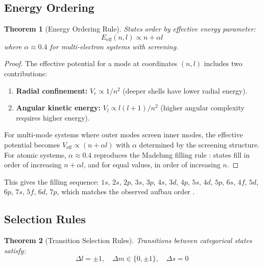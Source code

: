 \documentclass[11pt,a4paper]{article}
\newtheorem{theorem}{Theorem}[section]
\theoremstyle{definition}
\theoremstyle{remark}
\begin{document}
\subsection{Energy Ordering}

\begin{theorem}[Energy Ordering Rule]
\label{thm:energy_ordering}
States order by effective energy parameter:
\begin{equation}
E_{\mathrm{eff}}(n, l) \propto n + \alpha l
\label{eq:energy_ordering}
\end{equation}
where $\alpha \approx 0.4$ for multi-electron systems with screening.
\end{theorem}

\begin{proof}
The effective potential for a mode at coordinates $(n, l)$ includes two contributions:
\begin{enumerate}
\item \textbf{Radial confinement:} $V_r \propto 1/n^2$ (deeper shells have lower radial energy).
\item \textbf{Angular kinetic energy:} $V_l \propto l(l+1)/n^2$ (higher angular complexity requires higher energy).
\end{enumerate}

For multi-mode systems where outer modes screen inner modes, the effective potential becomes $V_{\mathrm{eff}} \propto (n + \alpha l)$ with $\alpha$ determined by the screening structure. For atomic systems, $\alpha \approx 0.4$ reproduces the Madelung filling rule \citep{madelung1936}: states fill in order of increasing $n + \alpha l$, and for equal values, in order of increasing $n$.
\end{proof}

This gives the filling sequence: $1s$, $2s$, $2p$, $3s$, $3p$, $4s$, $3d$, $4p$, $5s$, $4d$, $5p$, $6s$, $4f$, $5d$, $6p$, $7s$, $5f$, $6d$, $7p$, which matches the observed aufbau order \citep{schwarz2010}.

\subsection{Selection Rules}

\begin{theorem}[Transition Selection Rules]
\label{thm:selection}
Transitions between categorical states satisfy:
\begin{equation}
\Delta l = \pm 1, \quad \Delta m \in \{0, \pm 1\}, \quad \Delta s = 0
\label{eq:selection_rules}
\end{equation}
\end{theorem}
\end{document}
